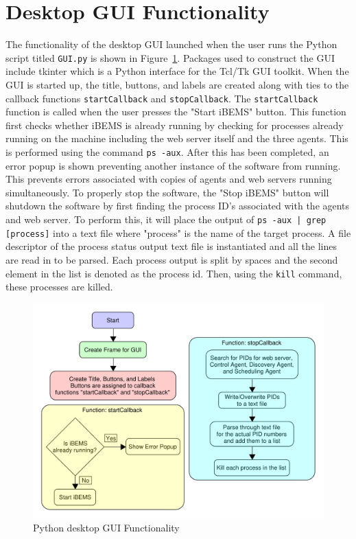 \section{Desktop GUI Functionality}
The functionality of the desktop GUI launched when the user runs the Python script titled \texttt{GUI.py} is shown in Figure~\ref{fig:desktopgui}. Packages used to construct the GUI include tkinter which is a Python interface for the Tcl/Tk GUI toolkit. When the GUI is started up, the title, buttons, and labels are created along with ties to the callback functions \texttt{startCallback} and \texttt{stopCallback}. The \texttt{startCallback} function is called when the user presses the "Start iBEMS" button. This function first checks whether iBEMS is already running by checking for processes already running on the machine including the web server itself and the three agents. This is performed using the command \texttt{ps -aux}. After this has been completed, an error popup is shown preventing another instance of the software from running. This prevents errors associated with copies of agents and web servers running simultaneously. To properly stop the software, the "Stop iBEMS" button will shutdown the software by first finding the process ID's associated with the agents and web server. To perform this, it will place the output of \texttt{ps -aux | grep [process]} into a text file where "process" is the name of the target process. A file descriptor of the process status output text file is instantiated and all the lines are read in to be parsed. Each process output is split by spaces and the second element in the list is denoted as the process id. Then, using the \texttt{kill} command, these processes are killed. 
\begin{figure}[H]
    \centering
    \includegraphics[scale=0.6]{figs/GUI_Diagram.pdf}
    \caption{Python desktop GUI Functionality}
    \label{fig:desktopgui}
\end{figure}

